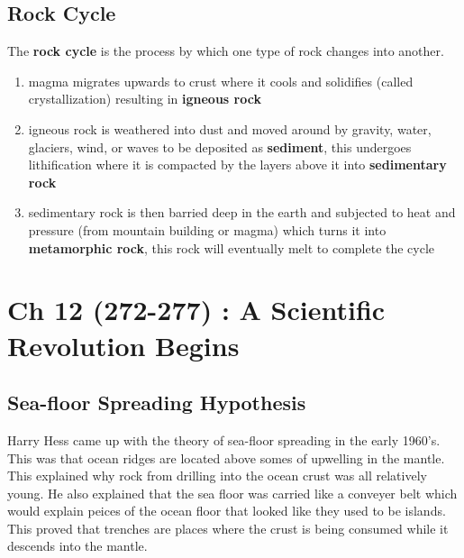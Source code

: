 \documentclass{article}
\begin{document}
\subsection{Rock Cycle} %
\label{sub:rock_cycle}
The \textbf{rock cycle} is the process by which one type of rock changes into another.

\begin{enumerate}
    \item magma migrates upwards to crust where it cools and solidifies (called crystallization) resulting in \textbf{igneous rock}
    \item igneous rock is weathered into dust and moved around by gravity, water, glaciers, wind, or waves to be deposited as \textbf{sediment}, this undergoes lithification where it is compacted by the layers above it into \textbf{sedimentary rock}
    \item sedimentary rock is then barried deep in the earth and subjected to heat and pressure (from mountain building or magma) which turns it into \textbf{metamorphic rock}, this rock will eventually melt to complete the cycle
\end{enumerate}


\section{Ch 12 (272-277) : A Scientific Revolution Begins} %
\label{sec:ch_12_272_277_a_scientific_revolution_begins}
\subsection{Sea-floor Spreading Hypothesis} %
\label{sub:sea_floor_spreading_hypothesis}
Harry Hess came up with the theory of sea-floor spreading in the early 1960's. This was that ocean ridges are located above somes of upwelling in the mantle. This explained why rock from drilling into the ocean crust was all relatively young. He also explained that the sea floor was carried like a conveyer belt which would explain peices of the ocean floor that looked like they used to be islands. This proved that trenches are places where the crust is being consumed while it descends into the mantle.
\end{document}
